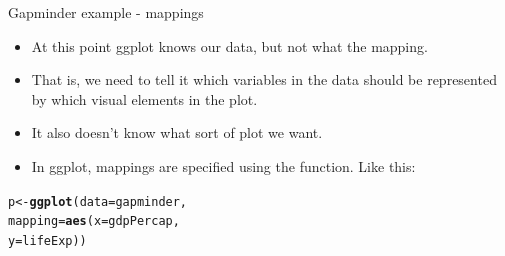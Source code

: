 \documentclass[10pt]{beamer}\usepackage[]{graphicx}\usepackage[]{color}
\makeatletter
\newcommand{\hlstd}[1]{\textcolor[rgb]{0.345,0.345,0.345}{#1}}%
\newcommand{\hlkwb}[1]{\textcolor[rgb]{0.69,0.353,0.396}{#1}}%
\newcommand{\hlkwc}[1]{\textcolor[rgb]{0.333,0.667,0.333}{#1}}%
\newcommand{\hlkwd}[1]{\textcolor[rgb]{0.737,0.353,0.396}{\textbf{#1}}}%
\newenvironment{kframe}{%
 \def\at@end@of@kframe{}%
 \ifinner\ifhmode%
  \def\at@end@of@kframe{\end{minipage}}%
  \begin{minipage}{\columnwidth}%
 \fi\fi%
 \def\FrameCommand##1{\hskip\@totalleftmargin \hskip-\fboxsep
 \colorbox{shadecolor}{##1}\hskip-\fboxsep
     \hskip-\linewidth \hskip-\@totalleftmargin \hskip\columnwidth}%
 \MakeFramed {\advance\hsize-\width
   \@totalleftmargin\z@ \linewidth\hsize
   \@setminipage}}%
 {\par\unskip\endMakeFramed%
 \at@end@of@kframe}
\newenvironment{knitrout}{}{} %
\makeatother
\begin{document}
\begin{frame}[fragile]{Gapminder example - mappings}
	
	\begin{itemize}
		\item At this point ggplot knows our data, but not what the mapping. 
		\item That is, we need to tell it which variables in the data should be represented by which visual elements in the plot. \item It also doesn’t know what sort of plot we want. 
		\item In ggplot, mappings are specified using the  function. Like this:
	\end{itemize}
	
\begin{knitrout}
\color{fgcolor}\begin{kframe}
\begin{alltt}
\hlstd{p} \hlkwb{<-} \hlkwd{ggplot}\hlstd{(}\hlkwc{data} \hlstd{= gapminder,}
            \hlkwc{mapping} \hlstd{=} \hlkwd{aes}\hlstd{(}\hlkwc{x} \hlstd{= gdpPercap,}
                          \hlkwc{y} \hlstd{= lifeExp))}
\end{alltt}
\end{kframe}
\end{knitrout}
	
\end{frame}
\end{document}
